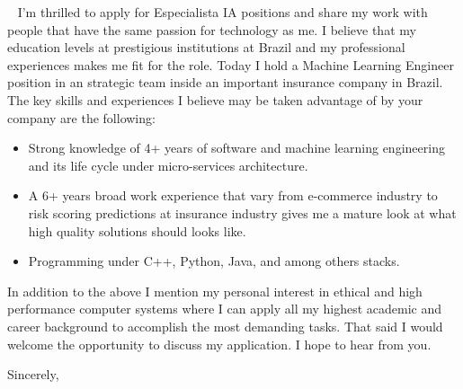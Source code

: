 \documentclass{scrlttr2}
\begin{document}
\begin{letter}{~ %
  }
  I’m thrilled to apply for Especialista IA positions and share my work with
  people that have the same passion for technology as me.  I believe that my
  education levels at prestigious institutions at Brazil and my professional
  experiences makes me ﬁt for the role.  Today I hold a Machine Learning
  Engineer position in an strategic team inside an important insurance company
  in Brazil. The key skills and experiences I believe may be taken advantage of
  by your company are the following:

  \begin{itemize}
  \item Strong knowledge of 4+ years of software and machine learning
    engineering and its life cycle under micro-services architecture.
  \item A 6+ years broad work experience that vary from e-commerce industry to
    risk scoring predictions at insurance industry gives me a mature look at
    what high quality solutions should looks like.
  \item Programming under C++, Python, Java, and among others stacks.
  \end{itemize}

  In addition to the above I mention my personal interest in ethical and high
  performance computer systems where I can apply all my highest academic and
  career background to accomplish the most demanding tasks. That said I would
  welcome the opportunity to discuss my application. I hope to hear from you.

  \closing{Sincerely,}


\end{letter}
\end{document}
